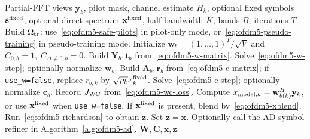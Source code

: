 \documentclass[journal]{IEEEtran}
\begin{document}
\begin{algorithm}[t]
\caption{OFDM5 block-coordinate LS local-ICI solver}
\label{alg:ofdm5-wc}
\footnotesize
\begin{algorithmic}[1]
\Require Partial-FFT views \(\mathbf y_k\), pilot mask, channel estimate
  \(H_k\), optional fixed symbols \(\mathbf s^{\rm fixed}\), optional direct
  spectrum \(\mathbf x^{\rm fixed}\), half-bandwidth \(K\), bands \(B\),
  iterations \(T\)
\State Build \(\Omega_{\rm tr}\): use~\eqref{eq:ofdm5-safe-pilots} in pilot-only
  mode, or~\eqref{eq:ofdm5-pseudo-training} in pseudo-training mode.
\State Initialize \(\mathbf w_b=(1,\ldots,1)^T/\sqrt V\) and
  \(C_{0,b}=1,\;C_{\Delta\ne0,b}=0\).
      \State Build \(\mathbf Y_b,\mathbf t_b\) from~\eqref{eq:ofdm5-w-matrix}.
      \State Solve~\eqref{eq:ofdm5-w-step}; optionally normalize \(\mathbf w_b\).
    \EndFor
  \EndIf
      \State Build \(\mathbf A_b,\mathbf r_b\) from~\eqref{eq:ofdm5-c-matrix};
        if \texttt{use\_w=false}, replace \(r_{b,k}\) by
        \(\sqrt{\rho_k}x^{\rm fixed}_k\).
      \State Solve~\eqref{eq:ofdm5-c-step}; optionally normalize \(\mathbf c_b\).
    \EndFor
  \EndIf
  \State Record \(J_{\rm WC}\) from~\eqref{eq:ofdm5-wc-loss}.
\EndFor
\State Compute \(x_{{\rm model},k}=\mathbf w_{b(k)}^H\mathbf y_k\), or
  use \(\mathbf x^{\rm fixed}\) when \texttt{use\_w=false}.
\State If \(\mathbf x^{\rm fixed}\) is present, blend by~\eqref{eq:ofdm5-xblend}.
  \State Run~\eqref{eq:ofdm5-richardson} to obtain \(\mathbf z\).
\Else
  \State Set \(\mathbf z=\mathbf x\).
\EndIf
\State Optionally call the AD symbol refiner in Algorithm~\ref{alg:ofdm5-ad}.
\State \Return \(\mathbf W,\mathbf C,\mathbf x,\mathbf z\).
\end{algorithmic}
\end{algorithm}
\end{document}
